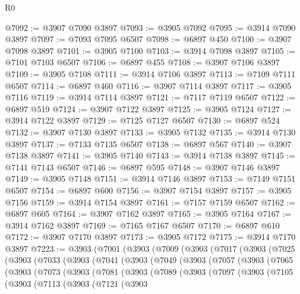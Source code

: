 \begin{lexlean}{R0}
\begin{coremodule}
@7092 := @3907 @7090 @3897
@7093 := @3905 @7092
@7095 := @3914 @7090 @3897
@7097 := @7093 @7095 @6507
@7098 := @6897 @450
@7100 := @3907 @7098 @3897
@7101 := @3905 @7100
@7103 := @3914 @7098 @3897
@7105 := @7101 @7103 @6507
@7106 := @6897 @455
@7108 := @3907 @7106 @3897
@7109 := @3905 @7108
@7111 := @3914 @7106 @3897
@7113 := @7109 @7111 @6507
@7114 := @6897 @460
@7116 := @3907 @7114 @3897
@7117 := @3905 @7116
@7119 := @3914 @7114 @3897
@7121 := @7117 @7119 @6507
@7122 := @6897 @519
@7124 := @3907 @7122 @3897
@7125 := @3905 @7124
@7127 := @3914 @7122 @3897
@7129 := @7125 @7127 @6507
@7130 := @6897 @524
@7132 := @3907 @7130 @3897
@7133 := @3905 @7132
@7135 := @3914 @7130 @3897
@7137 := @7133 @7135 @6507
@7138 := @6897 @567
@7140 := @3907 @7138 @3897
@7141 := @3905 @7140
@7143 := @3914 @7138 @3897
@7145 := @7141 @7143 @6507
@7146 := @6897 @595
@7148 := @3907 @7146 @3897
@7149 := @3905 @7148
@7151 := @3914 @7146 @3897
@7153 := @7149 @7151 @6507
@7154 := @6897 @600
@7156 := @3907 @7154 @3897
@7157 := @3905 @7156
@7159 := @3914 @7154 @3897
@7161 := @7157 @7159 @6507
@7162 := @6897 @605
@7164 := @3907 @7162 @3897
@7165 := @3905 @7164
@7167 := @3914 @7162 @3897
@7169 := @7165 @7167 @6507
@7170 := @6897 @610
@7172 := @3907 @7170 @3897
@7173 := @3905 @7172
@7175 := @3914 @7170 @3897
@7223 := @3903
    (@7001
      (@3903
        (@7009
          (@3903
            (@7017
              (@3903
                (@7025
                  (@3903
                    (@7033
                      (@3903
                        (@7041
                          (@3903
                            (@7049
                              (@3903
                                (@7057
                                  (@3903
                                    (@7065
                                      (@3903
                                        (@7073
                                          (@3903
                                            (@7081
                                              (@3903
                                                (@7089
                                                  (@3903
                                                    (@7097
                                                      (@3903
                                                        (@7105
                                                          (@3903
                                                            (@7113
                                                              (@3903
                                                                (@7121
                                                                  (@3903

\end{coremodule}
\end{lexlean}
